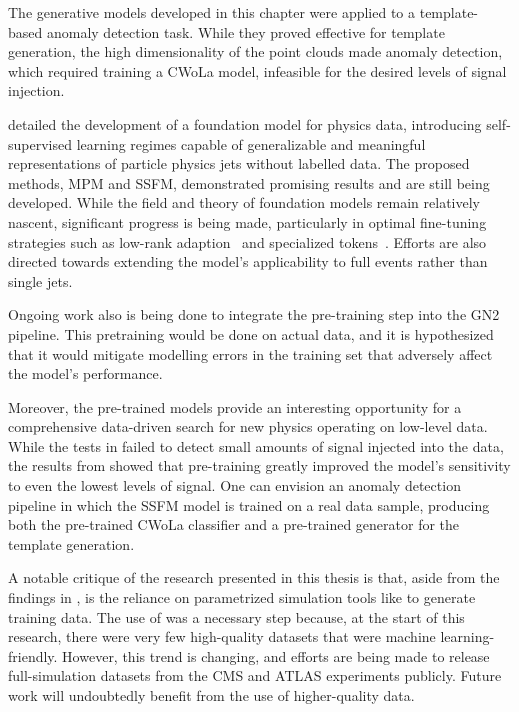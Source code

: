 The generative models developed in this chapter were applied to a template-based anomaly detection task.
While they proved effective for template generation, the high dimensionality of the point clouds made anomaly detection, which required training a CWoLa model, infeasible for the desired levels of signal injection.

 detailed the development of a foundation model for physics data, introducing self-supervised learning regimes capable of generalizable and meaningful representations of particle physics jets without labelled data.
The proposed methods, MPM and SSFM, demonstrated promising results and are still being developed.
While the field and theory of foundation models remain relatively nascent, significant progress is being made, particularly in optimal fine-tuning strategies such as low-rank adaption~\cite{LoRALowRankAdaptation} and specialized tokens~\cite{ParameterEfficientTuningSpecial}.
Efforts are also directed towards extending the model's applicability to full events rather than single jets.

Ongoing work also is being done to integrate the pre-training step into the GN2 pipeline.
This pretraining would be done on actual data, and it is hypothesized that it would mitigate modelling errors in the training set that adversely affect the model's performance.

Moreover, the pre-trained models provide an interesting opportunity for a comprehensive data-driven search for new physics operating on low-level data.
While the tests in  failed to detect small amounts of signal injected into the data, the results from  showed that pre-training greatly improved the model's sensitivity to even the lowest levels of signal.
One can envision an anomaly detection pipeline in which the SSFM model is trained on a real data sample, producing both the pre-trained CWoLa classifier and a pre-trained generator for the template generation.

A notable critique of the research presented in this thesis is that, aside from the findings in , is the reliance on parametrized simulation tools like \delphes to generate training data.
The use of \delphes was a necessary step because, at the start of this research, there were very few high-quality datasets that were machine learning-friendly.
However, this trend is changing, and efforts are being made to release full-simulation datasets from the CMS and ATLAS experiments publicly.
Future work will undoubtedly benefit from the use of higher-quality data.

